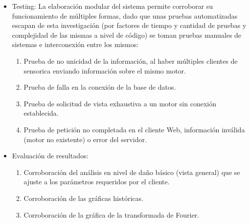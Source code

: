 \begin{itemize}
    \item Testing: La elaboración modular del sistema permite  corroborar su
        funcionamiento de múltiples formas, dado que unas pruebas automatizadas
        escapan de esta investigación (por factores de tiempo y cantidad de pruebas
        y complejidad de las mismas a nivel de código) se toman pruebas manuales
        de sistemas e interconexión entre los mismos:
        \begin{enumerate}
            \item Prueba de no unicidad de la información, al haber múltiples
                clientes de sensorica enviando información sobre el mismo motor.
            \item Prueba de falla en la conexión de la base de datos.
            \item Prueba de solicitud de vista exhaustiva a un motor sin conexión
                establecida.
            \item Prueba de petición no completada en el cliente Web,
            información inválida (motor no existente) o error del servidor.
        \end{enumerate}

    \item Evaluación de resultados:
        \begin{enumerate}
            \item Corroboración del análisis en nivel de daño básico (vista general)
                que se ajuste a los parámetros requeridos por el cliente.
            \item Corroboración de las gráficas históricas.
            \item Corroboración de la gráfica de la transformada de Fourier.
        \end{enumerate}
\end{itemize}


